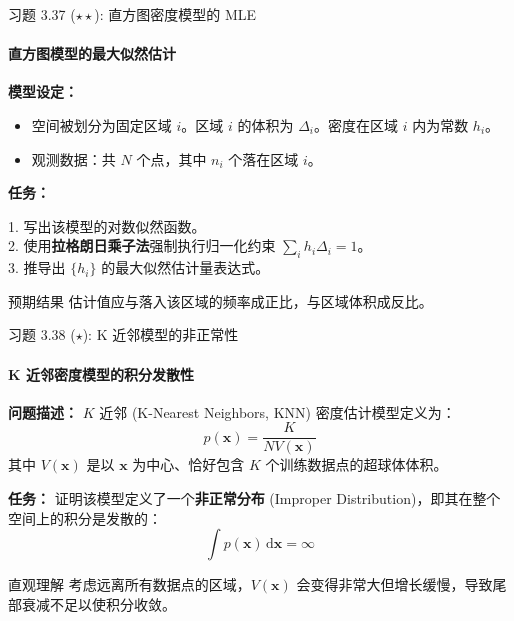 \documentclass[12pt, aspectratio=169]{beamer}
\newcommand{\vect}[1]{\mathbf{#1}}
\begin{document}
\begin{frame}{习题 3.37 ($\star\star$): 直方图密度模型的 MLE}
    \framesubtitle{直方图模型的最大似然估计}
    
    \textbf{模型设定：}
    \begin{itemize}
        \item 空间被划分为固定区域 $i$。区域 $i$ 的体积为 $\Delta_i$。密度在区域 $i$ 内为常数 $h_i$。
        \item 观测数据：共 $N$ 个点，其中 $n_i$ 个落在区域 $i$。
    \end{itemize}
    
    \vspace{0.5em}
    \textbf{任务：}
    
    1. 写出该模型的对数似然函数。\\
    2. 使用\textbf{拉格朗日乘子法}强制执行归一化约束 $\sum_i h_i \Delta_i = 1$。\\
    3. 推导出 $\{h_i\}$ 的最大似然估计量表达式。
    
    \vspace{0.5em}
    \begin{block}{预期结果}
        估计值应与落入该区域的频率成正比，与区域体积成反比。
    \end{block}
\end{frame}

\begin{frame}{习题 3.38 ($\star$): K 近邻模型的非正常性}
    \framesubtitle{K 近邻密度模型的积分发散性}
    
    \textbf{问题描述：}
    $K$ 近邻 (K-Nearest Neighbors, KNN) 密度估计模型定义为：
    \begin{equation*}
        p(\vect{x}) = \frac{K}{N V(\vect{x})}
    \end{equation*}
    其中 $V(\vect{x})$ 是以 $\vect{x}$ 为中心、恰好包含 $K$ 个训练数据点的超球体体积。
    
    \textbf{任务：}
    证明该模型定义了一个\textbf{非正常分布} (Improper Distribution)，即其在整个空间上的积分是发散的：
    \begin{equation*}
        \int p(\vect{x}) \,\mathrm{d}\vect{x} = \infty
    \end{equation*}
    
    \begin{alertblock}{直观理解}
        考虑远离所有数据点的区域，$V(\vect{x})$ 会变得非常大但增长缓慢，导致尾部衰减不足以使积分收敛。
    \end{alertblock}
\end{frame}
\end{document}
